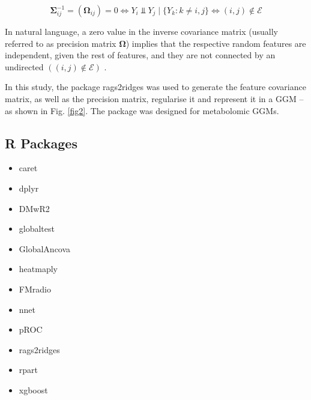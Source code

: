 \documentclass{amsart}
\theoremstyle{plain}
\begin{document}
\[ \mathbf{\Sigma}_{ij}^{-1} = (\mathbf{\Omega}_{ij})=0 \Longleftrightarrow Y_i \Perp Y_j\mid\{Y_k : k \neq i,j\} \Longleftrightarrow (i, j) \notin \mathcal{E} \]

In natural language, a zero value in the inverse covariance matrix (usually referred to as precision matrix $\mathbf{\Omega}$) implies that the respective random features are independent, given the rest of features, and they are not connected by an undirected $((i, j) \notin \mathcal{E})$ \cite{Peeters2022Rags2ridges:Matrices}.

In this study, the package \textsf{rags2ridges} \cite{Peeters2022Rags2ridges:Matrices} was used to generate the feature covariance matrix, as well as the precision matrix, regularise it and represent it in a GGM --as shown in Fig. \ref{fig2}. The package was designed for metabolomic GGMs.

\clearpage
\subsection{R Packages}
\hspace{5 pt}
\begin{multicols}{3}
\begin{itemize}
    \item[] \textsf{caret} \cite{Kuhn2008BuildingPackage}
    \item[]\textsf{dplyr} \cite{dplyr}
    \item[]\textsf{DMwR2} \cite{DMwR2}
    \item[]\textsf{globaltest} \cite{Goeman2004AOutcome, Goeman2006TestingAlternative, Goeman2023ThePackage}
    \item[]\textsf{GlobalAncova} \cite{Mansmann2005TestingApproach, Hummel2008GlobalANCOVA:Effects, Hummel2023GlobalExpression}
    \item[]\textsf{heatmaply} \cite{heatmaply}
    \item[]\textsf{FMradio} \cite{Peeters2019StableData}
    \item[]\textsf{nnet} \cite{nnet}
    \item[]\textsf{pROC} \cite{pROC}
    \item[]\textsf{rags2ridges} \cite{Peeters2022Rags2ridges:Matrices}
    \item[]\textsf{rpart} \cite{rpart}
    \item[]\textsf{xgboost} \cite{Chen2016XGBoost:System}
\end{itemize}
\end{multicols}
\end{document}
